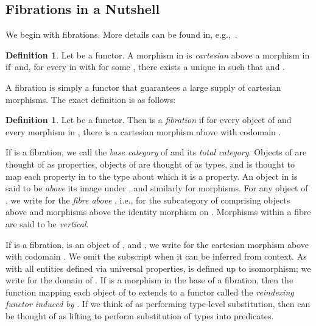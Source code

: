 \documentclass{LMCS}
\theoremstyle{plain}
\theoremstyle{remark}
\theoremstyle{definition}
\newtheorem{definition}[theorem]{Definition}
\begin{document}
\subsection{Fibrations in a Nutshell}\label{sec:nutshell} 

We begin with fibrations. More details can be found in,
e.g.,~\cite{jac99,pav90}.
\begin{definition}
  Let  be a functor. A morphism  in 
  is {\em cartesian} above a morphism  in  if\,  and, for every  in  with  for
  some , there exists a unique  in 
  such that  and .
\end{definition}

\noindent
A fibration is simply a functor  that guarantees a large
supply of cartesian morphisms. The exact definition is as follows:

\begin{definition}
  Let  be a functor. Then  is a {\em fibration} if
  for every object  of  and every morphism  in
  , there is a cartesian morphism above  with codomain . 
\end{definition}
If  is a fibration, we call  the {\em base
  category} of  and  its {\em total category}. Objects of 
are thought of as properties, objects of  are thought of as types,
and  is thought to map each property  in  to the type 
about which it is a property. An object  in  is said to be
\emph{above} its image  under , and similarly for
morphisms. For any object  of , we write  for the {\em
  fibre above }, i.e., for the subcategory of  comprising
objects above  and morphisms above the identity morphism  on
. Morphisms within a fibre are said to be {\em vertical}.

If  is a fibration,  is an object of , and , we write  for the cartesian morphism above  with
codomain .  We omit the subscript  when it can be inferred from
context. As with all entities defined via universal properties,
 is defined up to isomorphism; we write  for the domain
of . If  is a morphism in the base of a
fibration, then the function mapping each object  of  to
 extends to a functor  called the {\em
  reindexing functor induced by }. If we think of  as performing
type-level substitution, then  can be thought of as lifting 
to perform substitution of types into predicates.
\end{document}
